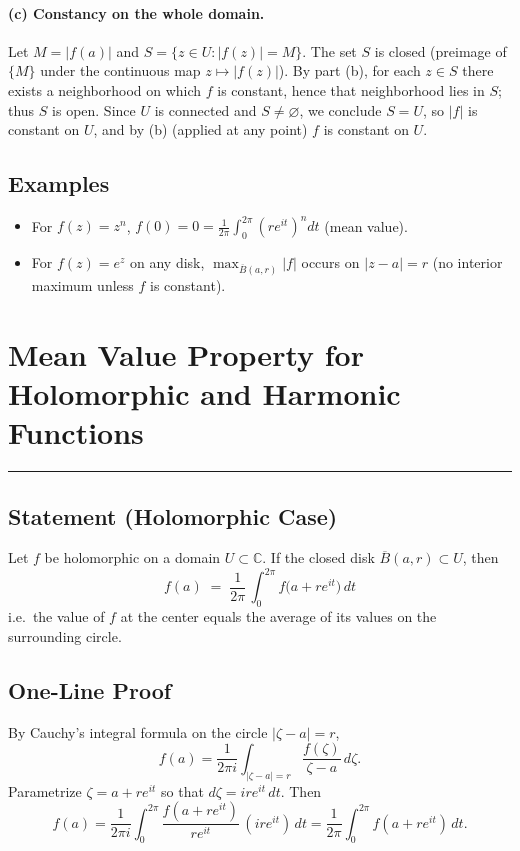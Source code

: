 \documentclass[11pt]{article}
\begin{document}
\paragraph{(c) Constancy on the whole domain.}
Let $M=|f(a)|$ and $S=\{z\in U: |f(z)|=M\}$. The set $S$ is closed (preimage of $\{M\}$ under the continuous map $z\mapsto|f(z)|$). By part (b), for each $z\in S$ there exists a neighborhood on which $f$ is constant, hence that neighborhood lies in $S$; thus $S$ is open. Since $U$ is connected and $S\neq\varnothing$, we conclude $S=U$, so $|f|$ is constant on $U$, and by (b) (applied at any point) $f$ is constant on $U$.

\subsection*{Examples}
\begin{itemize}
	\item For $f(z)=z^{n}$, $\displaystyle f(0)=0=\frac{1}{2\pi}\int_{0}^{2\pi} (re^{it})^{n}dt$ (mean value).
	\item For $f(z)=e^{z}$ on any disk, $\max_{\overline{B}(a,r)}|f|$ occurs on $|z-a|=r$ (no interior maximum unless $f$ is constant).
\end{itemize}

\section*{Mean Value Property for Holomorphic and Harmonic Functions}

\bigskip\hrule\bigskip

\subsection*{Statement (Holomorphic Case)}

Let $f$ be holomorphic on a domain $U\subset\mathbb{C}$. If the closed disk $\overline{B}(a,r)\subset U$, then
\[
\boxed{\; f(a)\;=\;\frac{1}{2\pi}\,\int_{0}^{2\pi} f\!\big(a+re^{it}\big)\,dt \;}
\]
i.e.\ the value of $f$ at the center equals the average of its values on the surrounding circle.

\bigskip

\subsection*{One-Line Proof}

By Cauchy’s integral formula on the circle $|\zeta-a|=r$,
\[
f(a)=\frac{1}{2\pi i}\int_{|\zeta-a|=r}\frac{f(\zeta)}{\zeta-a}\,d\zeta.
\]
Parametrize $\zeta=a+re^{it}$ so that $d\zeta=ire^{it}\,dt$. Then
\[
f(a)=\frac{1}{2\pi i}\int_{0}^{2\pi}\frac{f(a+re^{it})}{re^{it}}\,(ire^{it})\,dt
=\frac{1}{2\pi}\int_{0}^{2\pi} f(a+re^{it})\,dt.
\]
\end{document}
